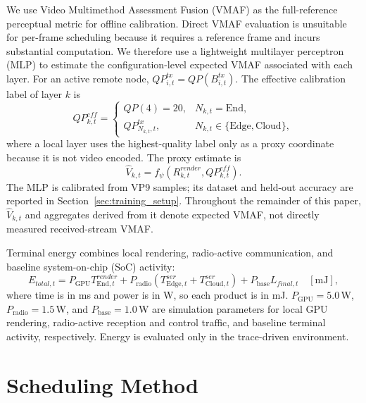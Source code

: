 \documentclass[acmsmall]{acmart}
\begin{document}
	We use Video Multimethod Assessment Fusion (VMAF) as the full-reference perceptual metric for offline calibration. Direct VMAF evaluation is unsuitable for per-frame scheduling because it requires a reference frame and incurs substantial computation. We therefore use a lightweight multilayer perceptron (MLP) to estimate the configuration-level expected VMAF associated with each layer. For an active remote node, $QP^{tx}_{i,t}=QP(B^{tx}_{i,t})$. The effective calibration label of layer $k$ is
	\begin{equation}
		QP^{eff}_{k,t}=\begin{cases}
			QP(4)=20, & N_{k,t}=\mathrm{End},\\
			QP^{tx}_{N_{k,t},t}, & N_{k,t}\in\{\mathrm{Edge},\mathrm{Cloud}\},
		\end{cases}
		\label{eq:effective_qp}
	\end{equation}
	where a local layer uses the highest-quality label only as a proxy coordinate because it is not video encoded. The proxy estimate is
	\begin{equation}
		\widehat V_{k,t}=f_{\psi}\!\left(R^{render}_{k,t},QP^{eff}_{k,t}\right).
		\label{eq:vmaf_proxy}
	\end{equation}
	The MLP is calibrated from VP9 samples; its dataset and held-out accuracy are reported in Section~\ref{sec:training_setup}. Throughout the remainder of this paper, $\widehat V_{k,t}$ and aggregates derived from it denote expected VMAF, not directly measured received-stream VMAF.

	Terminal energy combines local rendering, radio-active communication, and baseline system-on-chip (SoC) activity:
	\begin{equation}
		E_{total,t}=P_{\mathrm{GPU}}T^{render}_{\mathrm{End},t}
		+P_{\mathrm{radio}}\!\left(T^{ser}_{\mathrm{Edge},t}+T^{ser}_{\mathrm{Cloud},t}\right)
		+P_{\mathrm{base}}L_{final,t}\quad[\mathrm{mJ}],
		\label{eq:energy_model}
	\end{equation}
	where time is in ms and power is in W, so each product is in mJ.
	$P_{\mathrm{GPU}}=5.0$\,W, $P_{\mathrm{radio}}=1.5$\,W, and $P_{\mathrm{base}}=1.0$\,W are
	simulation parameters for local GPU rendering, radio-active reception and control traffic, and
	baseline terminal activity, respectively.
	Energy is evaluated only in the trace-driven environment.

	\section{Scheduling Method}
\end{document}
